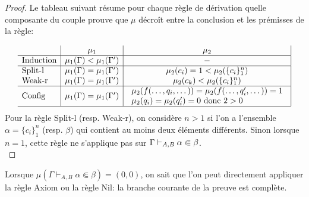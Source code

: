 \begin{proof}
  Le tableau suivant résume pour chaque règle de dérivation quelle composante du couple
  prouve que $\mu$ décroît entre la conclusion et les prémisses de la règle:
  
  \[\begin{array}[h]{l|c|c|}
    \footnotesize
    & \mu_1 & \mu_2 \\ \hline %
    \textrm{Induction}   & \strut \mu_1(\Gamma) < \mu_1(\Gamma') & - \\ \hline
    \textrm{Split-l} & \mu_1(\Gamma) = \mu_1(\Gamma') & 
      \mu_2(c_i) = 1 < \mu_2(\{c_i\}_1^n)\\

    \textrm{Weak-r} & \mu_1(\Gamma) = \mu_1(\Gamma') & \mu_2(c_k) < \mu_2(\{c_i\}_1^n)\\ \hline
    \textrm{Config} & \mu_1(\Gamma) = \mu_1(\Gamma') & 
    \begin{array}{l}
      \mu_2(f(\dots, q_i, \dots)) = \mu_2(f(\dots, q'_i, \dots)) = 1\\
      \mu_2(q_i) = \mu_2(q'_i) = 0 \textrm{ donc } 2 > 0
    \end{array}\\ \hline
\end{array} \]
Pour la règle Split-l (resp. Weak-r), on considère $n > 1$ si l'on a l'ensemble $\alpha = \{c_i\}_1^n$ (resp. $\beta$) qui contient
au moins deux éléments différents. Sinon lorsque $n = 1$, cette règle ne s'applique pas sur ${\Gamma \vdash_{\mathit A, \mathit B} \alpha \Subset \beta}$.\\
\end{proof}


\begin{theorem}
  Lorsque $\mu(\Gamma \vdash_{A, B} \alpha \Subset \beta) = (0, 0)$, on sait que l'on peut directement appliquer la règle Axiom ou la règle Nil:
  la branche courante de la preuve est complète.
\end{theorem}

